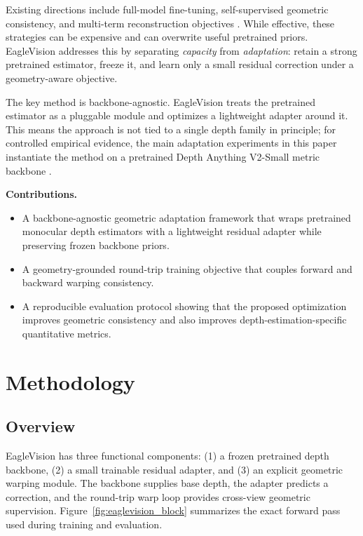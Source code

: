\documentclass{article}
\begin{document}
Existing directions include full-model fine-tuning, self-supervised geometric consistency, and multi-term reconstruction objectives \cite{godard2019monodepth2,ranftl2022midas,bhat2023zoedepth}. While effective, these strategies can be expensive and can overwrite useful pretrained priors. EagleVision addresses this by separating \emph{capacity} from \emph{adaptation}: retain a strong pretrained estimator, freeze it, and learn only a small residual correction under a geometry-aware objective.

The key method is backbone-agnostic. EagleVision treats the pretrained estimator as a pluggable module and optimizes a lightweight adapter around it. This means the approach is not tied to a single depth family in principle; for controlled empirical evidence, the main adaptation experiments in this paper instantiate the method on a pretrained Depth Anything V2-Small metric backbone \cite{yang2024depthanythingv2}.

\textbf{Contributions.}
\begin{itemize}
  \item A backbone-agnostic geometric adaptation framework that wraps pretrained monocular depth estimators with a lightweight residual adapter while preserving frozen backbone priors.
  \item A geometry-grounded round-trip training objective that couples forward and backward warping consistency.
  \item A reproducible evaluation protocol showing that the proposed optimization improves geometric consistency and also improves depth-estimation-specific quantitative metrics.
\end{itemize}

\section{Methodology}
\subsection{Overview}
EagleVision has three functional components: (1) a frozen pretrained depth backbone, (2) a small trainable residual adapter, and (3) an explicit geometric warping module. The backbone supplies base depth, the adapter predicts a correction, and the round-trip warp loop provides cross-view geometric supervision. Figure~\ref{fig:eaglevision_block} summarizes the exact forward pass used during training and evaluation.
\end{document}
